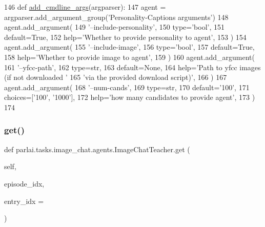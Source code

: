\begin{DoxyCode}
146     \textcolor{keyword}{def }\hyperlink{namespaceparlai_1_1agents_1_1drqa_1_1config_a62fdd5554f1da6be0cba185271058320}{add\_cmdline\_args}(argparser):
147         agent = argparser.add\_argument\_group(\textcolor{stringliteral}{'Personality-Captions arguments'})
148         agent.add\_argument(
149             \textcolor{stringliteral}{'--include-personality'},
150             type=\textcolor{stringliteral}{'bool'},
151             default=\textcolor{keyword}{True},
152             help=\textcolor{stringliteral}{'Whether to provide personality to agent'},
153         )
154         agent.add\_argument(
155             \textcolor{stringliteral}{'--include-image'},
156             type=\textcolor{stringliteral}{'bool'},
157             default=\textcolor{keyword}{True},
158             help=\textcolor{stringliteral}{'Whether to provide image to agent'},
159         )
160         agent.add\_argument(
161             \textcolor{stringliteral}{'--yfcc-path'},
162             type=str,
163             default=\textcolor{keywordtype}{None},
164             help=\textcolor{stringliteral}{'Path to yfcc images (if not downloaded '}
165             \textcolor{stringliteral}{'via the provided download script)'},
166         )
167         agent.add\_argument(
168             \textcolor{stringliteral}{'--num-cands'},
169             type=str,
170             default=\textcolor{stringliteral}{'100'},
171             choices=[\textcolor{stringliteral}{'100'}, \textcolor{stringliteral}{'1000'}],
172             help=\textcolor{stringliteral}{'how many candidates to provide agent'},
173         )
174 
\end{DoxyCode}
\mbox{\label{classparlai_1_1tasks_1_1image__chat_1_1agents_1_1ImageChatTeacher_ac7212c1001ab9c5027ae305ffdc9298f}} 
\subsubsection{\texorpdfstring{get()}{get()}}
{\footnotesize\ttfamily def parlai.\+tasks.\+image\+\_\+chat.\+agents.\+Image\+Chat\+Teacher.\+get (\begin{DoxyParamCaption}\item[{}]{self,  }\item[{}]{episode\+\_\+idx,  }\item[{}]{entry\+\_\+idx = {} }\end{DoxyParamCaption})}



